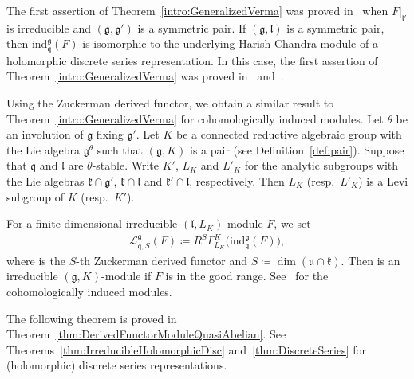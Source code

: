\documentclass[10pt,a4paper]{amsart}
\numberwithin{equation}{section}
\theoremstyle{definition}
\newcommand{\lieC}[1]{\mathfrak{#1}}
\newcommand{\lie}[1]{\mathfrak{#1}}
\newcommand{\ind}[2]{\mathrm{ind}^{\lieC{#1}}_{\lieC{#2}}}
\newcommand{\zuck}[2]{\Gamma^{#1}_{#2}}
\newcommand{\Dzuck}[3]{R^{#3}\zuck{#1}{#2}}
\newcommand{\lmod}[3]{\mathcal{L}^{\lie{#1}}_{\lie{#2}, #3}}
\begin{document}
The first assertion of Theorem~\ref{intro:GeneralizedVerma} was proved in~\cite[Lemma~3.1]{HMSW87} when $F|_{\lie{l'}}$ is irreducible and $(\lie{g}, \lie{g'})$ is a symmetric pair.
If $(\lie{g}, \lie{l})$ is a symmetric pair, then $\ind{g}{q}(F)$ is isomorphic to the underlying Harish-Chandra module of a holomorphic discrete series representation.
In this case, the first assertion of Theorem~\ref{intro:GeneralizedVerma} was proved in~\cite[Theorem~7.4]{Ko98} and~\cite{Ko12_generalized_Verma}.

Using the Zuckerman derived functor, we obtain a similar result to Theorem~\ref{intro:GeneralizedVerma} for cohomologically induced modules.
Let $\theta$ be an involution of $\lie{g}$ fixing $\lie{g'}$.
Let $K$ be a connected reductive algebraic group with the Lie algebra $\lie{g}^\theta$ such that $(\lie{g}, K)$ is a pair (see Definition~\ref{def:pair}).
Suppose that $\lie{q}$ and $\lie{l}$ are $\theta$-stable.
Write $K'$, $L_K$ and $L'_K$ for the analytic subgroups with the Lie algebras $\lie{k}\cap \lie{g'}$, $\lie{k}\cap \lie{l}$ and $\lie{k'}\cap \lie{l}$, respectively.
Then $L_K$ (resp.\ $L'_K$) is a Levi subgroup of $K$ (resp.\ $K'$).

For a finite-dimensional irreducible $(\lie{l}, L_K)$-module $F$, we set
\begin{align*}
	\lmod{g}{q}{S}(F) \coloneq \Dzuck{K}{L_K}{S}\bigl(\ind{g}{q}(F)\bigr),
\end{align*}
where \smash{$\Dzuck{K}{L_K}{S}$} is the $S$-th Zuckerman derived functor and $S\coloneq \dim(\lie{u}\cap \lie{k})$.
Then \smash{$\lmod{g}{q}{S}(F)$} is an irreducible $(\lie{g}, K)$-module if $F$ is in the good range.
See~\cite{KnVo95_cohomological_induction} for the cohomologically induced modules.

The following theorem is proved in Theorem~\ref{thm:DerivedFunctorModuleQuasiAbelian}.
See Theorems~\ref{thm:IrreducibleHolomorphicDisc} and~\ref{thm:DiscreteSeries} for (holomorphic) discrete series representations.
\end{document}
